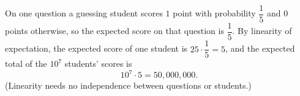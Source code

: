 On one question a guessing student scores $1$ point with probability $\dfrac15$ and $0$ points otherwise, so the expected score on that question is $\dfrac15$. By linearity of expectation, the expected score of one student is $25\cdot\dfrac15=5$, and the expected total of the $10^7$ students' scores is
\[10^7\cdot5=\boxed{50{,}000{,}000}.\]
(Linearity needs no independence between questions or students.)
